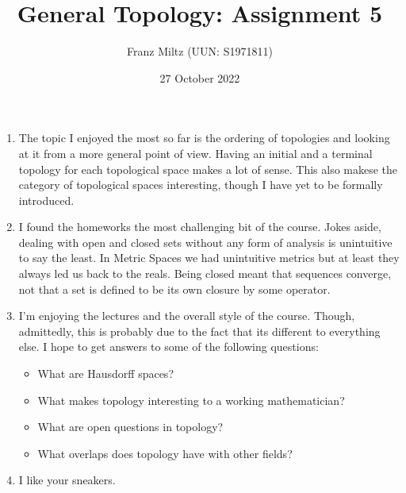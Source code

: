 \documentclass{article}
\begin{document}
\title{General Topology: Assignment 5}
\author{Franz Miltz (UUN: S1971811)}
\date{27 October 2022}
\maketitle

\begin{enumerate}
  \item The topic I enjoyed the most so far is the ordering of topologies and looking at
    it from a more general point of view. Having an initial and a terminal topology for each
    topological space makes a lot of sense. This also makese the category of topological
    spaces interesting, though I have yet to be formally introduced.
  \item I found the homeworks the most challenging bit of the course. Jokes aside, dealing with
    open and closed sets without any form of analysis is unintuitive to say the least.
    In Metric Spaces we had unintuitive metrics but at least they always led us back to the
    reals. Being closed meant that sequences converge, not that a set is defined to be its
    own closure by some operator.
  \item I'm enjoying the lectures and the overall style of the course. Though, admittedly,
    this is probably due to the fact that its different to everything else. I hope to get
    answers to some of the following questions: \begin{itemize}
      \item What are Hausdorff spaces?
      \item What makes topology interesting to a working mathematician?
      \item What are open questions in topology?
      \item What overlaps does topology have with other fields?
    \end{itemize}
  \item I like your sneakers.
\end{enumerate}
\end{document}
